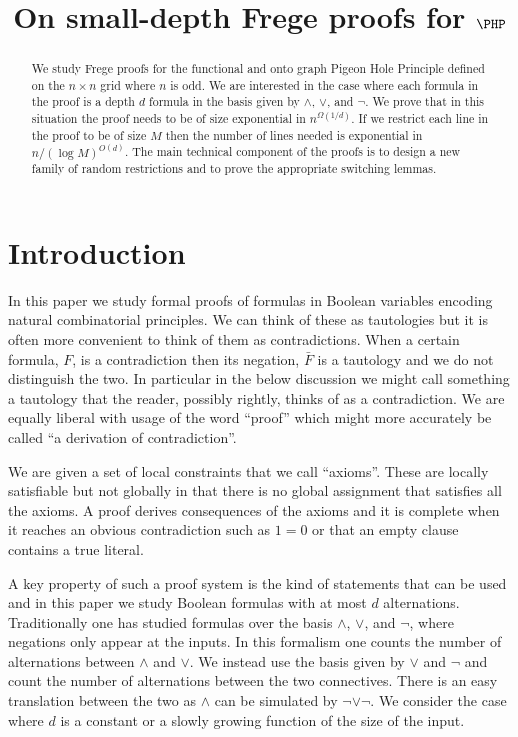 \documentclass{theoretics}
\title{On small-depth Frege proofs for \texorpdfstring{$\PHP$}{PHP}}
\begin{document}
 
\maketitle

\begin{abstract}
We study Frege proofs for the functional and onto
graph Pigeon Hole Principle
defined on the $n\times n$ grid where $n$ is odd.
We are interested in the case where each formula
in the proof is a depth $d$ formula in the basis given by
$\land$, $\lor$, and $\neg$.  We prove that in this situation the
proof needs to be of size exponential in $n^{\Omega (1/d)}$.
If we restrict each line in the proof to be of
size $M$ then the number of lines needed is exponential
in $n/(\log M)^{O(d)}$.   The main technical component of
the proofs is to design a new family of random restrictions
and to prove the appropriate switching lemmas.
\end{abstract}

\section{Introduction}
In this paper we study formal proofs of formulas in
Boolean variables encoding natural combinatorial principles.
We can think of these as tautologies but it is often
more convenient to think of them as contradictions.
When a certain formula, $F$, is a contradiction then its negation,
$\bar F$ is a tautology and we do not distinguish the two.
In particular in the below discussion we might call something
a tautology that the reader, possibly rightly, thinks of
as a contradiction.  We are equally liberal with usage
of the word ``proof'' which might more accurately be
called ``a derivation of contradiction''.  

We are given a set of local constraints that we call
``axioms''.  These are locally satisfiable but not globally in
that there is no global assignment that satisfies all the axioms.
A proof derives consequences
of the axioms and it is complete when it reaches 
an obvious contradiction such as $1=0$ or that an
empty clause contains a true literal.  

A key property of such a proof system is the kind
of statements that can be used and in
this paper we study Boolean formulas with at most $d$ alternations.
Traditionally one has studied formulas over the basis $\land$,
$\lor$, and $\neg$, where negations only appear at the 
inputs.  In this formalism one counts the number of alternations
between $\land$ and $\lor$.  We instead use the basis given
by $\lor$ and $\neg$ and count the number of alternations between
the two connectives.  There is an easy translation between the
two as $\land$ can be simulated by $\neg \lor \neg$.  We 
consider the case where $d$ is a constant or a slowly growing
function of the size of the input.
\end{document}
